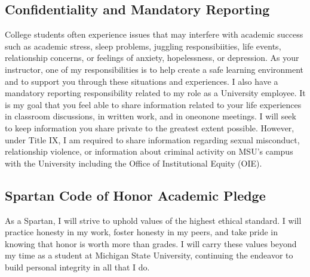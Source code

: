 \documentclass[letterpaper,10pt,english]{jupyterBook}
\begin{document}
\subsection{Confidentiality and Mandatory Reporting}
\label{\detokenize{content/0_course/resources:confidentiality-and-mandatory-reporting}}
\sphinxAtStartPar
College students often experience issues that may interfere with academic success such as academic stress, sleep problems, juggling responsibiities, life events, relationship concerns, or feelings of anxiety, hopelessness, or depression.
As your instructor, one of my responsibilities is to help create a safe learning environment and to support you through these situations and experiences.
I also have a mandatory reporting responsibility related to my role as a University employee.
It is my goal that you feel able to share information related to your life experiences in classroom
discussions, in written work, and in one\sphinxhyphen{}on\sphinxhyphen{}one meetings.
I will seek to keep information you share private to the greatest extent possible.
However, under Title IX, I am required to share information regarding sexual misconduct, relationship violence, or information
about criminal activity on MSU’s campus with the University including the Office of Institutional Equity (OIE).

\sphinxAtStartPar
{}


\subsection{Spartan Code of Honor Academic Pledge}
\label{\detokenize{content/0_course/resources:spartan-code-of-honor-academic-pledge}}
\sphinxAtStartPar
As a Spartan, I will strive to uphold values of the highest ethical standard. I will practice honesty in my work, foster honesty in my peers, and take pride in knowing that honor is worth more than grades. I will carry these values beyond my time as a student at Michigan State University, continuing the endeavor to build personal integrity in all that I do.
\end{document}
